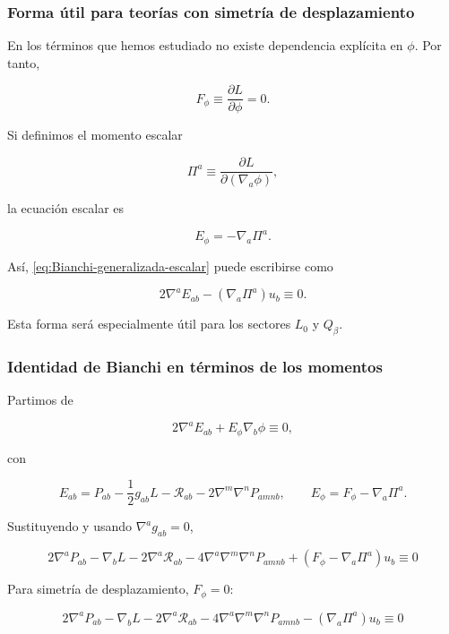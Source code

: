 \documentclass{beamer}
\newcommand{\Rcal}{\mathcal{R}}
\newcommand{\Eq}[1]{\eqref{#1}}
\begin{document}
\begin{frame}[label=nav-frame-087]
	\frametitle{Forma útil para teorías con simetría de desplazamiento}
	\small

	En los términos que hemos estudiado no existe dependencia
	explícita en $\phi$. Por tanto,

	\[
	F_\phi\equiv\frac{\partial L}{\partial\phi}=0.
	\]

	Si definimos el momento escalar

	\[
	\Pi^a\equiv
	\frac{\partial L}{\partial(\nabla_a\phi)},
	\]

	la ecuación escalar es

	\[
	E_\phi
	=
	-\nabla_a\Pi^a.
	\]

	Así, \Eq{eq:Bianchi-generalizada-escalar} puede escribirse como

	\begin{equation}
		\boxed{
			2\nabla^aE_{ab}
			-
			(\nabla_a\Pi^a)u_b
			\equiv0.
		}
		\label{eq:Bianchi-J}
	\end{equation}

	Esta forma será especialmente útil para los sectores
	$L_0$ y $Q_\beta$.

\end{frame}

\begin{frame}[label=nav-frame-088]
	\frametitle{Identidad de Bianchi en términos de los momentos}
	\small

	Partimos de

	\[
	2\nabla^aE_{ab}
	+
	E_\phi\nabla_b\phi
	\equiv0,
	\]

	con

	\[
	E_{ab}
	=
	P_{ab}
	-\frac12g_{ab}L
	-\Rcal_{ab}
	-2\nabla^m\nabla^nP_{amnb},
	\qquad
	E_\phi=F_\phi-\nabla_a\Pi^a.
	\]

	Sustituyendo y usando $\nabla^ag_{ab}=0$,

	\begin{equation}
	\boxed{
		2\nabla^aP_{ab}
		-\nabla_bL
		-2\nabla^a\Rcal_{ab}
		-4\nabla^a\nabla^m\nabla^nP_{amnb}
		+
		\left(F_\phi-\nabla_a\Pi^a\right)u_b
		\equiv0
		\label{Eq:BianchiGeneralizado}
	}
	\end{equation}

	Para simetría de desplazamiento, $F_\phi=0$:

	\[
	\boxed{
		2\nabla^aP_{ab}
		-\nabla_bL
		-2\nabla^a\Rcal_{ab}
		-4\nabla^a\nabla^m\nabla^nP_{amnb}
		-
		(\nabla_a\Pi^a)u_b
		\equiv0
	}
	\]

\end{frame}
\end{document}
